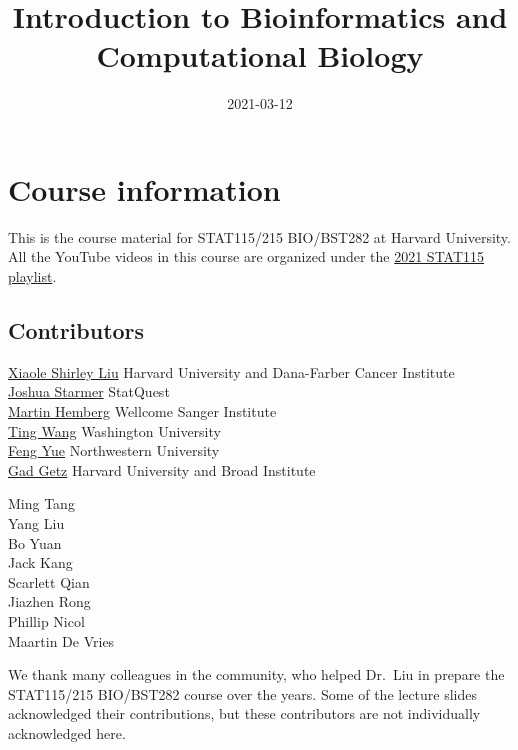 \documentclass[
]{book}
\title{Introduction to Bioinformatics and Computational Biology}
\author{}
\date{\vspace{-2.5em}2021-03-12}
\begin{document}
\maketitle

{
\setcounter{tocdepth}{1}
\tableofcontents
}
\hypertarget{course-information}{%
\chapter{Course information}\label{course-information}}

This is the course material for STAT115/215 BIO/BST282 at Harvard University.\\
All the YouTube videos in this course are organized under the \href{https://www.youtube.com/playlist?list=PLeB-Dlq-v6taAXK6ZCGfqImrNWJzFt3p3}{2021 STAT115 playlist}.

\hypertarget{contributors}{%
\section{Contributors}\label{contributors}}

\href{http://http://liulab.dfci.harvard.edu/}{Xiaole Shirley Liu} Harvard University and Dana-Farber Cancer Institute\\
\href{https://statquest.org/}{Joshua Starmer} StatQuest\\
\href{https://www.sanger.ac.uk/group/hemberg-group/}{Martin Hemberg} Wellcome Sanger Institute\\
\href{http://wang.wustl.edu/}{Ting Wang} Washington University\\
\href{http://yuelab.org/}{Feng Yue} Northwestern University\\
\href{https://www.broadinstitute.org/labs/getz}{Gad Getz} Harvard University and Broad Institute

Ming Tang\\
Yang Liu\\
Bo Yuan\\
Jack Kang\\
Scarlett Qian\\
Jiazhen Rong\\
Phillip Nicol\\
Maartin De Vries

We thank many colleagues in the community, who helped Dr.~Liu in prepare the STAT115/215 BIO/BST282 course over the years. Some of the lecture slides acknowledged their contributions, but these contributors are not individually acknowledged here.
\end{document}
